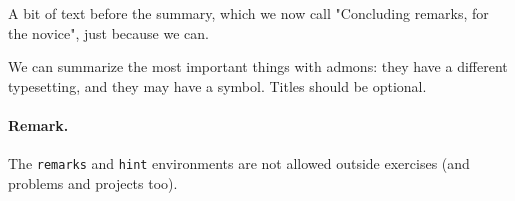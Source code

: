 \documentclass[%
oneside,                 %
final,                   %
10pt]{article}
\newenvironment{summaryshaded}
{\def\FrameCommand{\fboxsep=3mm\colorbox{colors1_summary_background}}
 \MakeFramed {\advance\hsize-\width \FrameRestore}}{\endMakeFramed}
\newenvironment{summary_colors1admon}[1][Summary]{
\begin{summaryshaded}
\noindent
\texttt{[image: latex\_figs/summary]}\ \ \   \textbf{#1}\\ \par
\vspace{-3mm}\nobreak\noindent\ignorespaces
}
{
\end{summaryshaded}
}
\begin{document}
A bit of text before the summary, which we now call "Concluding remarks,
for the novice",
just because we can.


\begin{summary_colors1admon}
We can summarize the most important things with admons: they have
a different typesetting, and they may have a symbol.
Titles should be optional.
\end{summary_colors1admon} %



\paragraph{Remark.}
The \texttt{remarks} and \texttt{hint} environments are not allowed outside
exercises (and problems and projects too).


\end{document}
